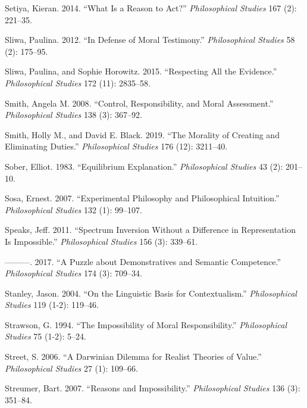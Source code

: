\documentclass[
  10pt,
  letterpaper,
  DIV=11,
  numbers=noendperiod,
  twoside]{scrartcl}
\newlength{\cslhangindent}
\newenvironment{CSLReferences}[2] %
 {\begin{list}{}{%
  \setlength{\itemindent}{0pt}
  \setlength{\leftmargin}{0pt}
  \setlength{\parsep}{0pt}
  \ifodd #1
   \setlength{\leftmargin}{\cslhangindent}
   \setlength{\itemindent}{-1\cslhangindent}
  \fi
  \setlength{\itemsep}{#2\baselineskip}}}
 {\end{list}}
\begin{document}
\begin{CSLReferences}{1}{0}
Setiya, Kieran. 2014. {``What Is a Reason to Act?''} \emph{Philosophical
Studies} 167 (2): 221--35.

Sliwa, Paulina. 2012. {``In Defense of Moral Testimony.''}
\emph{Philosophical Studies} 58 (2): 175--95.

Sliwa, Paulina, and Sophie Horowitz. 2015. {``Respecting All the
Evidence.''} \emph{Philosophical Studies} 172 (11): 2835--58.

Smith, Angela M. 2008. {``Control, Responsibility, and Moral
Assessment.''} \emph{Philosophical Studies} 138 (3): 367--92.

Smith, Holly M., and David E. Black. 2019. {``The Morality of Creating
and Eliminating Duties.''} \emph{Philosophical Studies} 176 (12):
3211--40.

Sober, Elliot. 1983. {``Equilibrium Explanation.''} \emph{Philosophical
Studies} 43 (2): 201--10.

Sosa, Ernest. 2007. {``Experimental Philosophy and Philosophical
Intuition.''} \emph{Philosophical Studies} 132 (1): 99--107.

Speaks, Jeff. 2011. {``Spectrum Inversion Without a Difference in
Representation Is Impossible.''} \emph{Philosophical Studies} 156 (3):
339--61.

---------. 2017. {``A Puzzle about Demonstratives and Semantic
Competence.''} \emph{Philosophical Studies} 174 (3): 709--34.

Stanley, Jason. 2004. {``On the Linguistic Basis for Contextualism.''}
\emph{Philosophical Studies} 119 (1-2): 119--46.

Strawson, G. 1994. {``The Impossibility of Moral Responsibility.''}
\emph{Philosophical Studies} 75 (1-2): 5--24.

Street, S. 2006. {``A Darwinian Dilemma for Realist Theories of
Value.''} \emph{Philosophical Studies} 27 (1): 109--66.

Streumer, Bart. 2007. {``Reasons and Impossibility.''}
\emph{Philosophical Studies} 136 (3): 351--84.


\end{CSLReferences}
\end{document}
